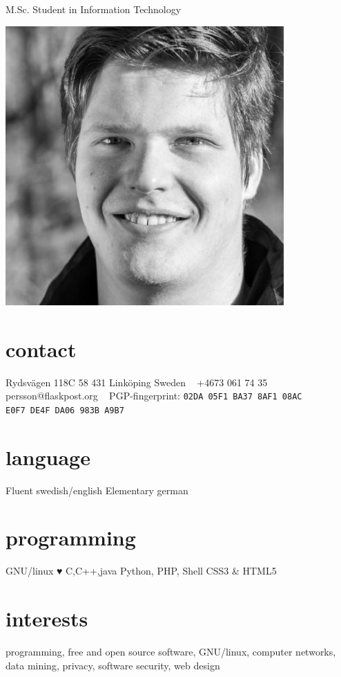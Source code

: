 \documentclass[]{friggeri-cv}
\begin{document}
       {M.Sc. Student in Information Technology}


\begin{aside}
	\includegraphics[width=0.8\textwidth]{me.jpg}
  \section{contact}
    Rydsvägen 118C
    58 431 Linköping
    Sweden
    ~
    +4673 061 74 35
    persson@flaskpost.org 
	~
	PGP-fingerprint:
	\texttt{02DA
	05F1 BA37 8AF1 08AC\\ E0F7 DE4F DA06 983B A9B7}
  \section{language}
    Fluent swedish/english
    Elementary german
  \section{programming}
  GNU/linux ♥
    C,C++,java
    Python, PHP, Shell
    CSS3 \& HTML5
\end{aside}

\section{interests}
{\centering programming, free and open source software, GNU/linux, computer networks,
data mining, privacy, software security, web design}
\end{document}
